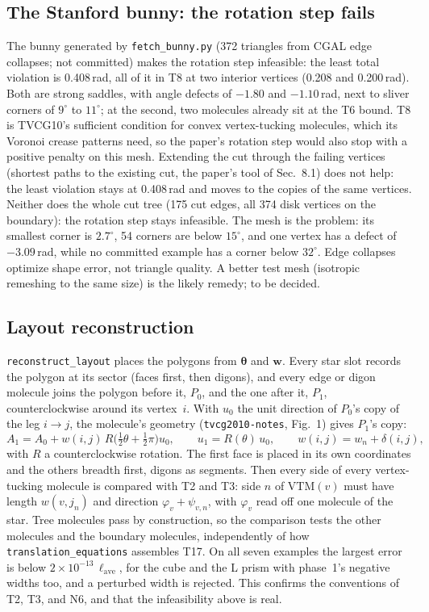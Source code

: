 \documentclass[11pt]{article}
\newcommand{\VTM}{\mathrm{VTM}}
\theoremstyle{definition}
\begin{document}
\subsection{The Stanford bunny: the rotation step fails}

The bunny generated by \texttt{fetch\_bunny.py} (372 triangles from CGAL edge
collapses; not committed) makes the rotation step infeasible: the least total
violation is 0.408\,rad, all of it in T8 at two interior vertices (0.208 and
0.200\,rad). Both are strong saddles, with angle defects of $-1.80$ and
$-1.10$\,rad, next to sliver corners of $9^\circ$ to $11^\circ$; at the second,
two molecules already sit at the T6 bound. T8 is TVCG10's sufficient
condition for convex vertex-tucking molecules, which its Voronoi crease
patterns need, so the paper's rotation step would also stop with a positive
penalty on this mesh. Extending the cut through the failing vertices (shortest
paths to the existing cut, the paper's tool of Sec.~8.1) does not help: the
least violation stays at 0.408\,rad and moves to the copies of the same
vertices. Neither does the whole cut tree (175 cut edges, all 374 disk
vertices on the boundary): the rotation step stays infeasible. The mesh is
the problem: its smallest corner is $2.7^\circ$, 54
corners are below $15^\circ$, and one vertex has a defect of $-3.09$\,rad,
while no committed example has a corner below $32^\circ$. Edge collapses
optimize shape error, not triangle quality. A better test mesh (isotropic
remeshing to the same size) is the likely remedy; to be decided.

\subsection{Layout reconstruction}

\texttt{reconstruct\_layout} places the polygons from $\boldsymbol\theta$ and
$\mathbf w$. Every star slot records the polygon at its sector (faces first,
then digons), and every edge or digon molecule joins the polygon before it,
$P_0$, and the one after it, $P_1$, counterclockwise around its vertex~$i$.
With $u_0$ the unit direction of $P_0$'s copy of the leg $i \to j$, the
molecule's geometry (\texttt{tvcg2010-notes}, Fig.~1) gives $P_1$'s copy:
\[
  A_1 = A_0 + w(i,j)\,R\bigl(\tfrac12\theta + \tfrac12\pi\bigr)u_0, \qquad
  u_1 = R(\theta)\,u_0, \qquad w(i,j) = w_n + \delta(i,j),
\]
with $R$ a counterclockwise rotation. The first face is placed in its own
coordinates and the others breadth first, digons as segments. Then every side
of every vertex-tucking molecule is compared with T2 and T3: side $n$ of
$\VTM(v)$ must have length $w(v,j_n)$ and direction $\varphi_v + \psi_{v,n}$,
with $\varphi_v$ read off one molecule of the star. Tree molecules pass by
construction, so the comparison tests the other molecules and the boundary
molecules, independently of how \texttt{translation\_equations} assembles
T17. On all seven examples the largest error is below
$2\times10^{-13}\,\ell_{\mathrm{ave}}$, for the cube and the L prism with
phase~1's negative widths too, and a perturbed width is rejected. This
confirms the conventions of T2, T3, and N6, and that the infeasibility above
is real.
\end{document}
